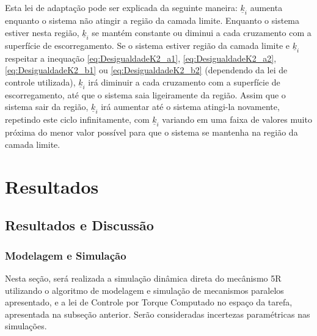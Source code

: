 \documentclass[]{politex}
\begin{document}
Esta lei de adaptação pode ser explicada da seguinte maneira: $\underline{k}_i$ aumenta enquanto o sistema não atingir a região da camada limite. Enquanto o sistema estiver nesta região, $\underline{k}_i$ se mantém constante ou diminui a cada cruzamento com a superfície de escorregamento. Se o sistema estiver região da camada limite e $\underline{k}_i$ respeitar a inequação \eqref{eq:DesigualdadeK2_a1}, \eqref{eq:DesigualdadeK2_a2}, \eqref{eq:DesigualdadeK2_b1} ou \eqref{eq:DesigualdadeK2_b2} (dependendo da lei de controle utilizada), $\underline{k}_i$ irá diminuir a cada cruzamento com a superfície de escorregamento, até que o sistema saia ligeiramente da região. Assim que o sistema sair da região, $\underline{k}_i$ irá aumentar até o sistema atingi-la novamente, repetindo este ciclo infinitamente, com $\underline{k}_i$ variando em uma faixa de valores muito próxima do menor valor possível para que o sistema se mantenha na região da camada limite.

\part{Resultados}

\chapter{Resultados e Discussão}


\section{Modelagem e Simulação}

Nesta seção, será realizada a simulação dinâmica direta do mecânismo 5R utilizando o algoritmo de modelagem e simulação de mecanismos paralelos apresentado, e a lei de Controle por Torque Computado no espaço da tarefa, apresentada na subseção anterior. Serão consideradas incertezas paramétricas nas simulações.
\end{document}
